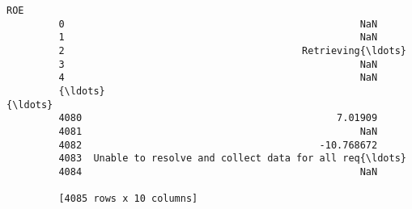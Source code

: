 \documentclass[11pt]{article}
\begin{document}
\begin{Verbatim}[commandchars=\\\{\}]
                                                             ROE  
         0                                                   NaN  
         1                                                   NaN  
         2                                         Retrieving{\ldots}  
         3                                                   NaN  
         4                                                   NaN  
         {\ldots}                                                 {\ldots}  
         4080                                            7.01909  
         4081                                                NaN  
         4082                                         -10.768672  
         4083  Unable to resolve and collect data for all req{\ldots}  
         4084                                                NaN  
         
         [4085 rows x 10 columns]
\end{Verbatim}
            

    
    
    
    
\end{document}
